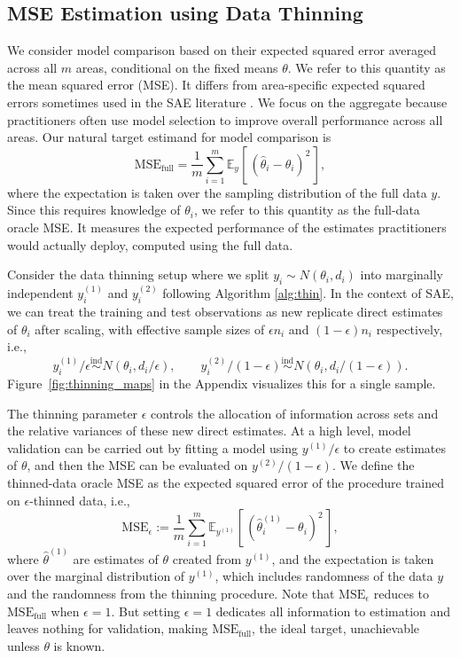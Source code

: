 \documentclass[11pt]{article}
\newcommand{\ind}{\stackrel{\text{ind}}{\sim}}
\newcommand{\thetatrain}{\hat{\theta}^{(1)}}           %
\newcommand{\ytrain}{y^{(1)}}                           %
\newcommand{\ytest}{y^{(2)}}                            %
\newcommand{\msethin}{\mathrm{MSE}_{\epsilon}}
\newcommand{\msefull}{\mathrm{MSE}_{\mathrm{full}}}
\newcommand{\E}[2][]{\mathbb{E}_{#1}\!\left[\,#2\,\right]}
\newcommand{\N}[2]{N\!\left(#1, #2\right)}
\theoremstyle{plain}
\theoremstyle{definition}
\theoremstyle{remark}
\begin{document}

\subsection{MSE Estimation using Data Thinning}
We consider model comparison based on their expected squared error averaged across all $m$ areas, conditional on the fixed means $\theta$. We refer to this quantity as the mean squared error (MSE).  It differs from area-specific expected squared errors sometimes used in the SAE literature \citep[see e.g.,][]{prasad_estimation_1990}. We focus on the aggregate because practitioners often use model selection to improve overall performance across all areas. Our natural target estimand for model comparison is
\[
\msefull = \frac{1}{m}\sum_{i=1}^m \E[y]{(\hat{\theta}_i - \theta_i)^2},
\]
where the expectation is taken over the sampling distribution of the full data $y$. Since this requires knowledge of $\theta_i$, we refer to this quantity as the full-data oracle MSE.  It measures the expected performance of the estimates practitioners would actually deploy, computed using the full data.

Consider the data thinning setup where we split $y_i \sim \N{\theta_i}{d_i}$ into marginally independent $\ytrain_i$ and $\ytest_i$ following Algorithm \ref{alg:thin}. In the context of SAE, we can treat the training and test observations as new replicate direct estimates of $\theta_i$ after scaling, with effective sample sizes of $\epsilon n_i$ and $(1-\epsilon)n_i$ respectively, i.e.,
\[
 \ytrain_i / \epsilon \ind \N{\theta_i}{d_i/\epsilon}, \qquad  \ytest_i /(1-\epsilon) \ind \N{\theta_i}{d_i/(1-\epsilon)}.
\]
Figure~\ref{fig:thinning_maps} in the Appendix visualizes this for a single sample.

The thinning parameter $\epsilon$ controls the allocation of information across sets and the relative variances of these new direct estimates. At a high level, model validation can be carried out by fitting a model using $\ytrain/\epsilon$ to create estimates of $\theta$, and then the MSE can be evaluated on $\ytest/(1-\epsilon)$. We define the thinned-data oracle MSE as the expected squared error of the procedure trained on $\epsilon$-thinned data, i.e.,
\[
\msethin := \frac{1}{m}\sum_{i=1}^m \E[\ytrain]{\left( \thetatrain_i - \theta_i \right)^2},
\]
where $\thetatrain$ are estimates of $\theta$ created from $\ytrain$, and the expectation is taken over the marginal distribution of $\ytrain$, which includes randomness of the data $y$ and the randomness from the thinning procedure. Note that $\msethin$ reduces to $\msefull$ when $\epsilon = 1$. But setting $\epsilon = 1$ dedicates all information to estimation and leaves nothing for validation, making $\msefull$, the ideal target, unachievable unless $\theta$ is known.
\end{document}

